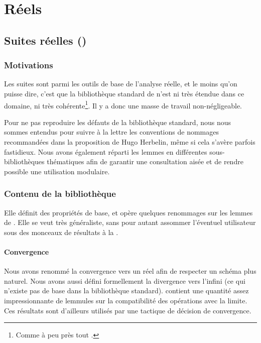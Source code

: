 \section{Réels}

\subsection{Suites réelles ()}

\subsubsection{Motivations}

Les suites sont parmi les outils de base de l'analyse réelle, et le moins qu'on puisse dire, c'est que la bibliothèque standard de \coq{} n'est ni très étendue dans ce domaine, ni très cohérente\footnote{Comme à peu près tout .}. Il y a donc une masse de travail non-négligeable.

Pour ne pas reproduire les défauts de la bibliothèque standard, nous nous sommes entendus pour suivre à la lettre les conventions de nommages recommandées dans la proposition de Hugo Herbelin\cite{naming_conventions}, même si cela s'avère parfois fastidieux. Nous avons également réparti les lemmes en différentes sous-bibliothèques thématiques afin de garantir une consultation aisée et de rendre possible une utilisation modulaire.

\subsubsection{Contenu de la bibliothèque}

Elle définit des propriétés de base, et opère quelques renommages sur les lemmes de . Elle se veut très généraliste, sans pour autant assommer l'éventuel utilisateur sous des monceaux de résultats à la .

\paragraph{Convergence} Nous avons renommé la convergence vers un réel afin de respecter un schéma plus naturel. Nous avons aussi défini formellement la divergence vers l'infini (ce qui n'existe pas de base dans la bibliothèque standard).  contient une quantité assez impressionnante de lemmules sur la compatibilité des opérations avec la limite. Ces résultats sont d'ailleurs utilisés par une tactique de décision de convergence.

